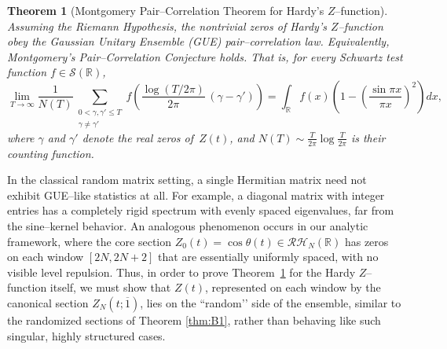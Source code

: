 \documentclass[12pt,reqno]{amsart}
\theoremstyle{plain}
\newtheorem{mainthm}{Theorem}
\theoremstyle{definition}
\theoremstyle{remark}
\begin{document}
\begin{mainthm}[Montgomery Pair--Correlation Theorem for Hardy’s $Z$--function]\label{thm:B}
Assuming the Riemann Hypothesis, the nontrivial zeros of Hardy’s $Z$--function 
obey the Gaussian Unitary Ensemble (GUE) pair--correlation law.  
Equivalently, Montgomery’s Pair--Correlation Conjecture holds.  
That is, for every Schwartz test function $f \in \mathcal{S}(\mathbb{R})$,
\begin{equation}\label{eq:PCC-thmB}
\lim_{T \to \infty}
\frac{1}{N(T)}
\!\!\sum_{\substack{0<\gamma,\gamma'\le T\\\gamma\ne\gamma'}}
f\!\left(
\frac{\log(T/2\pi)}{2\pi}\,(\gamma-\gamma')
\right)
=
\int_{\mathbb{R}} 
f(x)
\!\left(
1-\left(\frac{\sin\pi x}{\pi x}\right)^{\!2}
\right)
dx,
\end{equation}
where $\gamma$ and $\gamma'$ denote the real zeros of~$Z(t)$, 
and $N(T)\sim \tfrac{T}{2\pi}\log\!\tfrac{T}{2\pi}$ is their counting function. 
\end{mainthm}

In the classical random matrix setting, a single
Hermitian matrix need not exhibit GUE--like statistics at all. For example, a diagonal
matrix with integer entries has a completely rigid spectrum with evenly spaced eigenvalues,
far from the sine--kernel behavior. An analogous phenomenon occurs in our analytic
framework, where the core section \(Z_0(t)=\cos\theta(t)\in\mathcal{RH}_N(\mathbb{R})\) has zeros
on each window \([2N,2N+2]\) that are essentially uniformly spaced, with no visible level
repulsion. Thus, in order to prove Theorem~\ref{thm:B} for the Hardy \(Z\)–function itself,
we must show that \(Z(t)\), represented on each window by the canonical section
\(Z_N(t;\overline{1})\), lies on the “random’’ side of the ensemble, similar to the randomized sections of Theorem \ref{thm:B1}, rather than behaving
like such singular, highly structured cases. 
\end{document}
